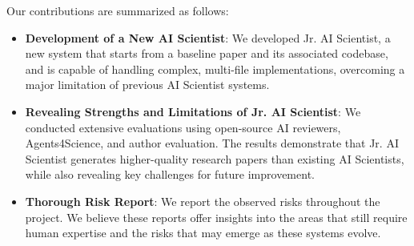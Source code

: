 Our contributions are summarized as follows:
\begin{itemize}
      \item \textbf{Development of a New AI Scientist}: We developed Jr. AI Scientist, a new system that starts from a baseline paper and its associated codebase, and is capable of handling complex, multi-file implementations, overcoming a major limitation of previous AI Scientist systems.
      \item \textbf{Revealing Strengths and Limitations of Jr. AI Scientist}: We conducted extensive evaluations using open-source AI reviewers, Agents4Science, and author evaluation. The results demonstrate that Jr. AI Scientist generates higher-quality research papers than existing AI Scientists, while also revealing key challenges for future improvement.
     \item \textbf{Thorough Risk Report}: We report the observed risks throughout the project. We believe these reports offer insights into the areas that still require human expertise and the risks that may emerge as these systems evolve.
\end{itemize}















